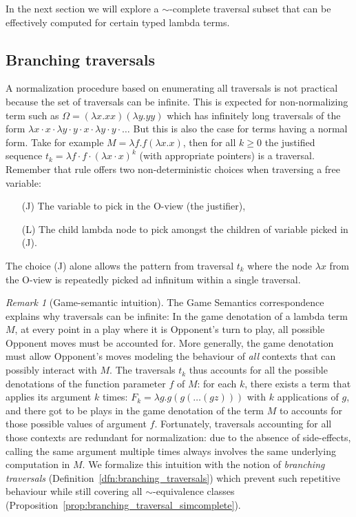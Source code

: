 \documentclass{article}
\theoremstyle{plain}
\theoremstyle{definition}
\theoremstyle{remark}
\newtheorem{remark}{Remark}[section]
\begin{document}
In the next section we will explore a $\sim$-complete traversal subset that can be effectively computed for certain typed lambda terms.

\subsection{Branching traversals}

A normalization procedure based on enumerating all traversals is not practical because the set of traversals can be infinite. This is expected for non-normalizing term such as $\Omega = (\lambda x. x x)(\lambda y. y y)$ which has infinitely long traversals of the form $\lambda x \cdot x \cdot \lambda y \cdot y \cdot x \cdot \lambda y \cdot y \cdot \ldots$ But this is also the case for terms having a normal form. Take for example $M = \lambda f . f (\lambda x. x)$, then for all $k\geq0$ the justified sequence $t_k = \lambda f \cdot f \cdot (\lambda x \cdot  x)^k$ (with appropriate pointers) is a traversal.
Remember that rule  offers two non-deterministic choices when traversing a free variable:
\begin{itemize}
\item[(J)] The variable to pick in the O-view (the justifier),
\item[(L)] The child lambda node to pick amongst the children of variable picked in (J).
\end{itemize}
The choice (J) alone allows the pattern from traversal $t_k$ where the node $\lambda x$ from the O-view is repeatedly picked ad infinitum within a single traversal.

\begin{remark}[Game-semantic intuition]
The Game Semantics correspondence explains why traversals can be infinite: In the game denotation of a lambda term $M$, at every point in a play where it is Opponent's turn to play, all possible Opponent moves must be accounted for. More generally, the game denotation must allow Opponent's moves modeling the behaviour of \emph{all} contexts that can possibly interact with $M$. The traversals $t_k$ thus accounts for all the possible denotations of the function parameter $f$ of $M$: for each $k$, there exists a term that applies its argument $k$ times: $F_k = \lambda g . g (g ( \ldots (g z)))$ with $k$ applications of $g$, and there got to be plays in the game denotation of the term $M$ to accounts for those possible values of argument $f$. Fortunately, traversals accounting for all those contexts are redundant for normalization: due to the absence of side-effects, calling the same argument multiple times always involves the same underlying computation in $M$. We formalize this intuition with the notion of \emph{branching traversals} (Definition~\ref{dfn:branching_traversals})  which prevent such repetitive behaviour while still covering all $\sim$-equivalence classes (Proposition~\ref{prop:branching_traversal_simcomplete}).
\end{remark}
\end{document}
